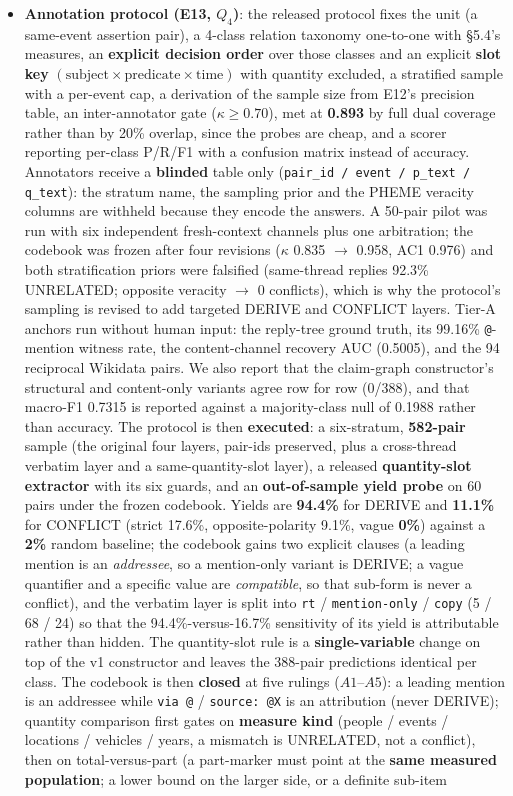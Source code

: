 \begin{itemize}
\item \textbf{Annotation protocol (E13, $Q_4$)}: the released protocol fixes the unit (a same-event assertion pair), a 4-class relation taxonomy one-to-one with \S5.4's measures, an \textbf{explicit decision order} over those classes and an explicit \textbf{slot key} $(\text{subject}\times\text{predicate}\times\text{time})$ with quantity excluded, a stratified sample with a per-event cap, a derivation of the sample size from E12's precision table, an inter-annotator gate ($\kappa\ge0.70$), met at \textbf{0.893} by full dual coverage rather than by 20\% overlap, since the probes are cheap, and a scorer reporting per-class P/R/F1 with a confusion matrix instead of accuracy. Annotators receive a \textbf{blinded} table only (\texttt{pair\_id / event / p\_text / q\_text}): the stratum name, the sampling prior and the PHEME veracity columns are withheld because they encode the answers. A 50-pair pilot was run with six independent fresh-context channels plus one arbitration; the codebook was frozen after four revisions ($\kappa$ 0.835 $\to$ 0.958, AC1 0.976) and both stratification priors were falsified (same-thread replies 92.3\% UNRELATED; opposite veracity $\to$ 0 conflicts), which is why the protocol's sampling is revised to add targeted DERIVE and CONFLICT layers. Tier-A anchors run without human input: the reply-tree ground truth, its 99.16\% \texttt{@}-mention witness rate, the content-channel recovery AUC (0.5005), and the 94 reciprocal Wikidata pairs. We also report that the claim-graph constructor's structural and content-only variants agree row for row (0/388), and that macro-F1 0.7315 is reported against a majority-class null of 0.1988 rather than accuracy. The protocol is then \textbf{executed}: a six-stratum, \textbf{582-pair} sample (the original four layers, pair-ids preserved, plus a cross-thread verbatim layer and a same-quantity-slot layer), a released \textbf{quantity-slot extractor} with its six guards, and an \textbf{out-of-sample yield probe} on 60 pairs under the frozen codebook. Yields are \textbf{94.4\%} for DERIVE and \textbf{11.1\%} for CONFLICT (strict 17.6\%, opposite-polarity 9.1\%, vague \textbf{0\%}) against a \textbf{2\%} random baseline; the codebook gains two explicit clauses (a leading mention is an \emph{addressee}, so a mention-only variant is DERIVE; a vague quantifier and a specific value are \emph{compatible}, so that sub-form is never a conflict), and the verbatim layer is split into \texttt{rt} / \texttt{mention-only} / \texttt{copy} (5 / 68 / 24) so that the 94.4\%-versus-16.7\% sensitivity of its yield is attributable rather than hidden. The quantity-slot rule is a \textbf{single-variable} change on top of the v1 constructor and leaves the 388-pair predictions identical per class. The codebook is then \textbf{closed} at five rulings ($A1$--$A5$): a leading mention is an addressee while \texttt{via @} / \texttt{source: @X} is an attribution (never DERIVE); quantity comparison first gates on \textbf{measure kind} (people / events / locations / vehicles / years, a mismatch is UNRELATED, not a conflict), then on total-versus-part (a part-marker must point at the \textbf{same measured population}; a lower bound on the larger side, or a definite sub-item 
\end{itemize}
